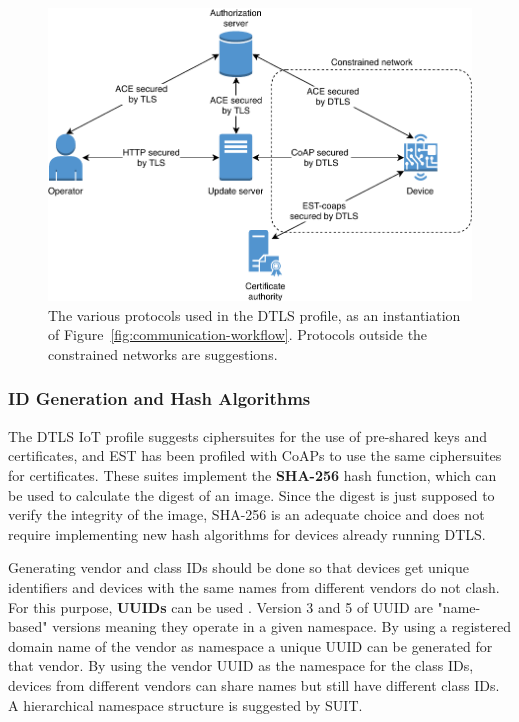 \documentclass[0-thesis.tex]{subfiles}
\begin{document}
\begin{figure}[t]
    \caption[The various protocols used in the DTLS profile.]
        {The various protocols used in the DTLS profile, as an instantiation of
            Figure~\ref{fig:communication-workflow}. Protocols outside the constrained networks are suggestions.}
    \label{fig:dtls-profile}
    \includegraphics{images/dtls-profile.pdf}
\end{figure}

\subsubsection{ID Generation and Hash Algorithms}
\label{sssec:hash-id-algorithm}
The DTLS IoT profile suggests ciphersuites for the use of pre-shared keys and
certificates, and EST has been profiled with CoAPs to use the same ciphersuites for
certificates. These suites implement the \textbf{SHA-256} hash function, which can be used
to calculate the digest of an image. Since the digest is just supposed to verify the
integrity of the image, SHA-256 is an adequate choice and does not require implementing
new hash algorithms for devices already running DTLS.

Generating vendor and class IDs should be done so that devices get unique identifiers and
devices with the same names from different vendors do not clash. For this purpose,
\textbf{UUIDs} can be used \parencite{rfc4122}. Version 3 and 5 of UUID are "name-based"
versions meaning they operate in a given namespace. By using a registered domain name of
the vendor as namespace a unique UUID can be generated for that vendor. By using the
vendor UUID as the namespace for the class IDs, devices from different vendors can share
names but still have different class IDs. A hierarchical namespace structure is suggested
by SUIT.
\end{document}
